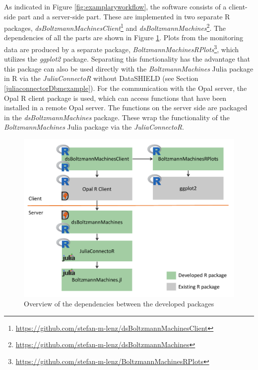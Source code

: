 \documentclass[12pt]{article}
\newcommand{\apkg}[1]{\emph{#1}}
\begin{document}
As indicated in Figure \ref{fig:examplaryworkflow}, the software consists of a client-side part and a server-side part.
These are implemented in two separate R packages, \apkg{dsBoltzmannMachinesClient}\footnote{\url{https://github.com/stefan-m-lenz/dsBoltzmannMachinesClient}} and \apkg{dsBoltzmannMachines}\footnote{\url{https://github.com/stefan-m-lenz/dsBoltzmannMachines}}.
The dependencies of all the parts are shown in Figure \ref{fig:dsBoltzmann_dependencies}.
Plots from the monitoring data are produced by a separate package, \apkg{BoltzmannMachinesRPlots}\footnote{\url{https://github.com/stefan-m-lenz/BoltzmannMachinesRPlots}}, which utilizes the \apkg{ggplot2} \citep{ggplot2} package.
Separating this functionality has the advantage that this package can also be used directly with the \apkg{BoltzmannMachines} Julia package in R via the \apkg{JuliaConnectoR} without DataSHIELD (see Section \ref{juliaconnectorDbmexample}).
For the communication with the Opal server, the Opal R client package is used, which can access functions that have been installed in a remote Opal server.
The functions on the server side are packaged in the \apkg{dsBoltzmannMachines} package.
These wrap the functionality of the \apkg{BoltzmannMachines} Julia package via the \apkg{JuliaConnectoR}.

\begin{figure}[h]
   \centering
   \includegraphics[scale=0.6]{images/dsBoltzmannMachinesOverview.pdf}
   \caption{Overview of the dependencies between the developed packages}
   \label{fig:dsBoltzmann_dependencies}
 \end{figure}   
 
\end{document}
